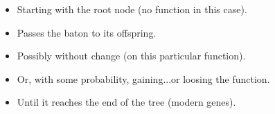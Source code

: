 \documentclass[aspectratio=169,9pt,handout]{beamer}
\begin{document}
\begin{frame}[label=aphylographicalview,c]
\begin{minipage}[m]{.38\linewidth}
\begin{itemize}
			\item Starting with the root node (no function in this case).\pause
			\item Passes the baton to its offspring.\pause
			\item Possibly without change (on this particular function).\pause
			\item Or, with some probability, gaining...\pause[7] or loosing the function.\pause
			\item Until it reaches the end of the tree (modern genes).\pause
		\end{itemize}
		\vfill\hfill\hyperlink{duplicationvsspeciation}{} %
		\hyperlink{aphylographicalview}{}
		\hyperlink{aphylo-prob-diagram}{}
	\end{minipage}
	
\end{frame}
\end{document}
